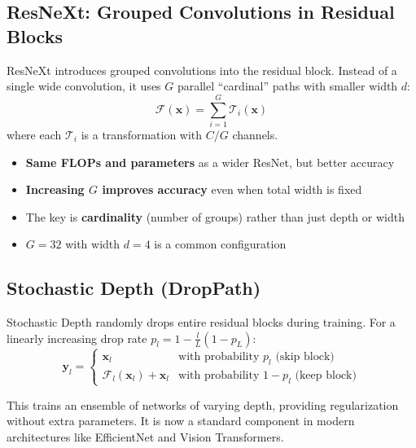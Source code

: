 \subsection{ResNeXt: Grouped Convolutions in Residual Blocks}

ResNeXt \cite{xie2017aggregated} introduces grouped convolutions into the residual block. Instead of a single wide convolution, it uses $G$ parallel ``cardinal'' paths with smaller width $d$:
\begin{equation}
\mathcal{F}(\mathbf{x}) = \sum_{i=1}^{G} \mathcal{T}_i(\mathbf{x})
\end{equation}
where each $\mathcal{T}_i$ is a transformation with $C/G$ channels.

\begin{properties}
\begin{itemize}
    \item \textbf{Same FLOPs and parameters} as a wider ResNet, but better accuracy
    \item \textbf{Increasing $G$ improves accuracy} even when total width is fixed
    \item The key is \textbf{cardinality} (number of groups) rather than just depth or width
    \item $G = 32$ with width $d = 4$ is a common configuration
\end{itemize}
\end{properties}

\subsection{Stochastic Depth (DropPath)}

Stochastic Depth \cite{huang2016deep} randomly drops entire residual blocks during training. For a linearly increasing drop rate $p_l = 1 - \frac{l}{L}(1 - p_L)$:
\begin{equation}
\mathbf{y}_l = \begin{cases} \mathbf{x}_l & \text{with probability } p_l \text{ (skip block)} \\ \mathcal{F}_l(\mathbf{x}_l) + \mathbf{x}_l & \text{with probability } 1 - p_l \text{ (keep block)} \end{cases}
\end{equation}

This trains an ensemble of networks of varying depth, providing regularization without extra parameters. It is now a standard component in modern architectures like EfficientNet and Vision Transformers.

